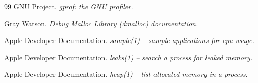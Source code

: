\begin{thebibliography}{99}
GNU Project.
{\itshape gprof: the GNU profiler.}

Gray Watson.
{\itshape Debug Malloc Library (dmalloc) documentation.}

Apple Developer Documentation.
{\itshape sample(1) -- sample applications for cpu usage.}

Apple Developer Documentation.
{\itshape leaks(1) -- search a process for leaked memory.}

Apple Developer Documentation.
{\itshape heap(1) -- list allocated memory in a process.}
\end{thebibliography}
\pagebreak

